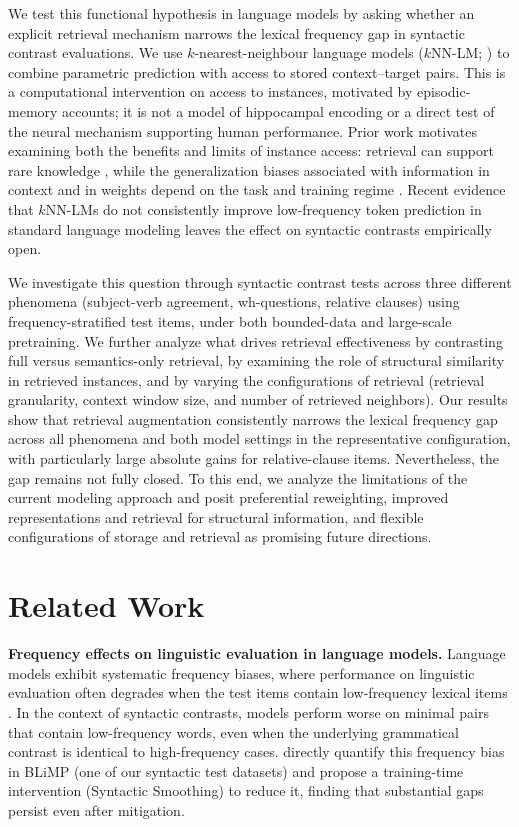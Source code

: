 We test this functional hypothesis in language models by asking whether an explicit retrieval mechanism narrows the lexical frequency gap in syntactic contrast evaluations. We use $k$-nearest-neighbour language models ($k$NN-LM; \citealt{khandelwal2020knnlm}) to combine parametric prediction with access to stored context--target pairs. This is a computational intervention on access to instances, motivated by episodic-memory accounts; it is not a model of hippocampal encoding or a direct test of the neural mechanism supporting human performance. Prior work motivates examining both the benefits and limits of instance access: retrieval can support rare knowledge \citep{mallen2023trust,kandpal2023large}, while the generalization biases associated with information in context and in weights depend on the task and training regime \citep{lampinen2025latent,chan2022transformers}. Recent evidence that $k$NN-LMs do not consistently improve low-frequency token prediction in standard language modeling \citep{nishida2025long} leaves the effect on syntactic contrasts empirically open.


We investigate this question through syntactic contrast tests across three different phenomena (subject-verb agreement, wh-questions, relative clauses) using frequency-stratified test items, under both bounded-data and large-scale pretraining. We further analyze what drives retrieval effectiveness by contrasting full versus semantics-only retrieval, by examining the role of structural similarity in retrieved instances, and by varying the configurations of retrieval (retrieval granularity, context window size, and number of retrieved neighbors). Our results show that retrieval augmentation consistently narrows the lexical frequency gap across all phenomena and both model settings in the representative configuration, with particularly large absolute gains for relative-clause items. Nevertheless, the gap remains not fully closed. To this end, we analyze the limitations of the current modeling approach and posit preferential reweighting, improved representations and retrieval for structural information, and flexible configurations of storage and retrieval as promising future directions.






\section{Related Work}

\noindent \textbf{Frequency effects on linguistic evaluation in language models.}
Language models exhibit systematic frequency biases, where performance on linguistic evaluation often degrades when the test items contain low-frequency lexical items \citep{wei-etal-2021-frequency,kim2022uncontrolled}. In the context of syntactic contrasts, models perform worse on minimal pairs that contain low-frequency words, even when the underlying grammatical contrast is identical to high-frequency cases. \citet{diehl-martinez-etal-2024-mitigating} directly quantify this frequency bias in BLiMP (one of our syntactic test datasets) and propose a training-time intervention (Syntactic Smoothing) to reduce it, finding that substantial gaps persist even after mitigation. 


